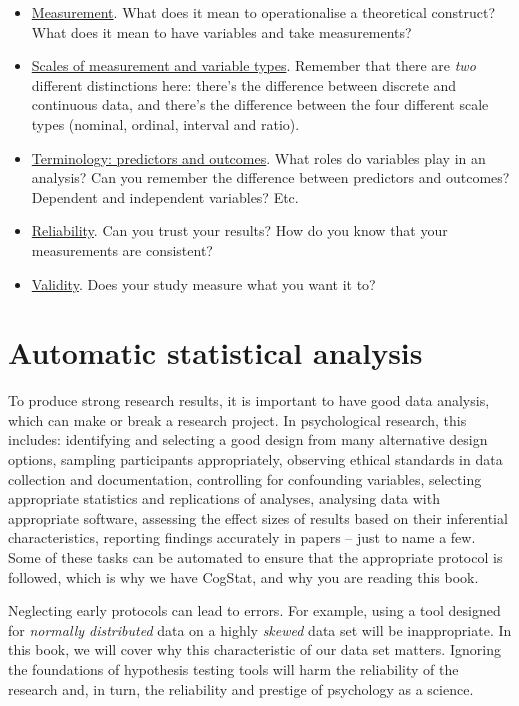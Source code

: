 \documentclass[
  11pt,
  a4paper,
  twoside,symmetric,openright]{book}
\providecommand{\tightlist}{%
  \setlength{\itemsep}{0pt}\setlength{\parskip}{0pt}}
\theoremstyle{break}
\theoremstyle{break}
\begin{document}
\begin{itemize}
\tightlist
\item
  \hyperref[measurement]{Measurement}. What does it mean to operationalise a theoretical construct? What does it mean to have variables and take measurements?
\item
  \hyperref[scales]{Scales of measurement and variable types}. Remember that there are \emph{two} different distinctions here: there's the difference between discrete and continuous data, and there's the difference between the four different scale types (nominal, ordinal, interval and ratio).
\item
  \hyperref[ivdv]{Terminology: predictors and outcomes}. What roles do variables play in an analysis? Can you remember the difference between predictors and outcomes? Dependent and independent variables? Etc.
\item
  \hyperref[reliability]{Reliability}. Can you trust your results? How do you know that your measurements are consistent?
\item
  \hyperref[validity]{Validity}. Does your study measure what you want it to?
\end{itemize}

\chapter{Automatic statistical analysis}\label{autostat}

To produce strong research results, it is important to have good data analysis, which can make or break a research project. In psychological research, this includes: identifying and selecting a good design from many alternative design options, sampling participants appropriately, observing ethical standards in data collection and documentation, controlling for confounding variables, selecting appropriate statistics and replications of analyses, analysing data with appropriate software, assessing the effect sizes of results based on their inferential characteristics, reporting findings accurately in papers -- just to name a few. Some of these tasks can be automated to ensure that the appropriate protocol is followed, which is why we have CogStat, and why you are reading this book.

Neglecting early protocols can lead to errors. For example, using a tool designed for \emph{normally distributed} data on a highly \emph{skewed} data set will be inappropriate. In this book, we will cover why this characteristic of our data set matters. Ignoring the foundations of hypothesis testing tools will harm the reliability of the research and, in turn, the reliability and prestige of psychology as a science.
\end{document}
